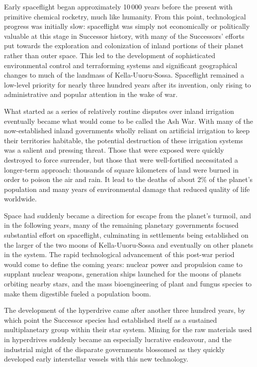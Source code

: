 \documentclass[11pt]{report}
\begin{document}
    Early spaceflight began approximately 10\,000 years before the present with primitive chemical rocketry, much like humanity. From this point, technological progress was initially slow: spaceflight was simply not economically or politically valuable at this stage in Successor history, with many of the Successors' efforts put towards the exploration and colonization of inland portions of their planet rather than outer space. This led to the development of sophisticated environmental control and terraforming systems and significant geographical changes to much of the landmass of Kella-Uuoru-Sossa. Spaceflight remained a low-level priority for nearly three hundred years after its invention, only rising to administrative and popular attention in the wake of war.

    What started as a series of relatively routine disputes over inland irrigation eventually became what would come to be called the Ash War. With many of the now-established inland governments wholly reliant on artificial irrigation to keep their territories habitable, the potential destruction of these irrigation systems was a salient and pressing threat. Those that were exposed were quickly destroyed to force surrender, but those that were well-fortified necessitated a longer-term approach: thousands of square kilometers of land were burned in order to poison the air and rain. It lead to the deaths of about 2\% of the planet's population and many years of environmental damage that reduced quality of life worldwide.
    
    Space had suddenly became a direction for escape from the planet's turmoil, and in the following years, many of the remaining planetary governments focused substantial effort on spaceflight, culminating in settlements being established on the larger of the two moons of Kella-Uuoru-Sossa and eventually on other planets in the system. The rapid technological advancement of this post-war period would come to define the coming years: nuclear power and propulsion came to supplant nuclear weapons, generation ships launched for the moons of planets orbiting nearby stars, and the mass bioengineering of plant and fungus species to make them digestible fueled a population boom.

    The development of the hyperdrive came after another three hundred years, by which point the Successor species had established itself as a sustained multiplanetary group within their star system. Mining for the raw materials used in hyperdrives suddenly became an especially lucrative endeavour, and the industrial might of the disparate governments blossomed as they quickly developed early interstellar vessels with this new technology.
\end{document}
